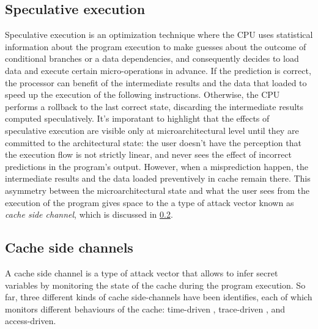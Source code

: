 \documentclass[12pt,a4paper]{book}
\theoremstyle{definition}
\begin{document}
	\subsection{Speculative execution}\label{sec:speculative-exec}
	Speculative execution is an optimization technique where the CPU uses statistical information about the program execution to make guesses about the outcome of conditional branches or a data dependencies, and consequently decides to load data and execute certain micro-operations in advance. If the prediction is correct, the processor can benefit of the intermediate results and the data that loaded to speed up the execution of the following instructions. Otherwise, the CPU performs a rollback to the last correct state, discarding the intermediate results computed speculatively. It's imporatant to highlight that the effects of speculative execution are visible only at microarchitectural level until they are committed to the architectural state: the user doesn't have the perception that the execution flow is not strictly linear, and never sees the effect of incorrect predictions in the program's output. However, when a misprediction happen, the intermediate results and the data loaded preventively in cache remain there. This asymmetry between the microarchitectural state and what the user sees from the execution of the program gives space to the a type of attack vector known as \textit{cache side channel}, which is discussed in \ref{sec:cache-sc}.
	
	\subsection{Cache side channels}\label{sec:cache-sc}
	A cache side channel \cite{Zhang2017} is a type of attack vector that allows to infer secret variables by monitoring the state of the cache during the program execution. So far, three different kinds of cache side-channels have been identifies, each of which monitors different behaviours of the cache: time-driven \cite{Page2002}, trace-driven \cite{Page2002}, and access-driven.
\end{document}

